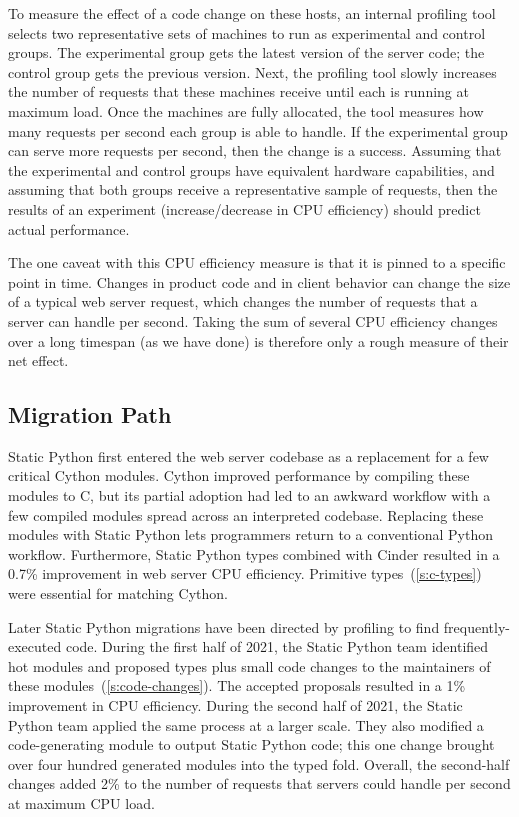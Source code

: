 \documentclass[english,cleveref,submission]{programming}
\newcommand{\SP}{Static Python}
\newcommand{\CPUchange}{3.7\%}
\begin{document}
To measure the effect of a code change on these hosts, an internal profiling tool selects
two representative sets of machines to run as experimental and control groups.
The experimental group gets the latest version of the server code;
the control group gets the previous version.
Next, the profiling tool slowly increases the number of requests that these
machines receive until each is running at maximum load.
Once the machines are fully allocated, the tool measures how many requests
per second each group is able to handle.
If the experimental group can serve more requests per second, then the change
is a success.
Assuming that the experimental and control groups have equivalent hardware
capabilities, and assuming that both groups receive a representative sample
of requests, then the results of an experiment (increase/decrease in CPU efficiency)
should predict actual performance.

The one caveat with this CPU efficiency measure is that it is pinned
to a specific point in time.
Changes in product code and in client behavior can change the size
of a typical web server request, which changes the number
of requests that a server can handle per second.
Taking the sum of several CPU efficiency changes over a long
timespan (as we have done) is therefore only a rough
measure of their net effect.


\subsection{Migration Path}
\label{s:migration-path}

\SP{} first entered the web server codebase as a replacement for a
few critical Cython modules.
Cython improved performance by compiling these modules to C,
but its partial adoption had led to an awkward workflow with a
few compiled modules spread across an interpreted codebase.
Replacing these modules with \SP{} lets programmers return to a conventional
Python workflow.
Furthermore, \SP{} types combined with Cinder resulted in a
0.7\% improvement in web server CPU efficiency.
Primitive types~(\cref{s:c-types}) were essential for matching Cython.

Later \SP{} migrations have been directed by profiling to find frequently-executed code.
During the first half of 2021, the \SP{} team identified hot
modules and proposed types plus small code changes to the maintainers of these modules~(\cref{s:code-changes}).
The accepted proposals resulted in a 1\% improvement in CPU efficiency.
During the second half of 2021, the \SP{} team applied the same
process at a larger scale.
They also modified a code-generating module to output \SP{} code;
this one change brought over four hundred generated modules into the typed fold.
Overall, the second-half changes added 2\% to the number of requests
that servers could handle per second at maximum CPU load.
\end{document}
